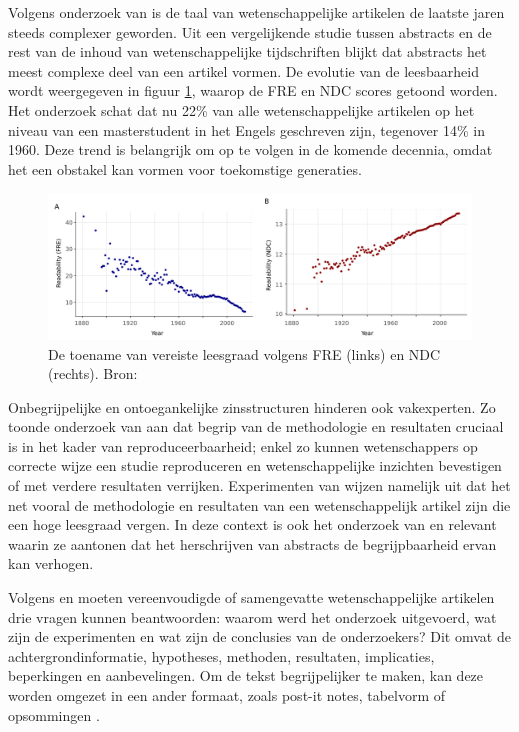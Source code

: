 Volgens onderzoek van \textcite{PlavenSigray2017} is de taal van wetenschappelijke artikelen de laatste jaren steeds complexer geworden. Uit een vergelijkende studie tussen abstracts en de rest van de inhoud van wetenschappelijke tijdschriften blijkt dat abstracts het meest complexe deel van een artikel vormen. De evolutie van de leesbaarheid wordt weergegeven in figuur \ref{img:fre-ndc}, waarop de FRE en NDC scores getoond worden. Het onderzoek schat dat nu 22\% van alle wetenschappelijke artikelen op het niveau van een masterstudent in het Engels geschreven zijn, tegenover 14\% in 1960. Deze trend is belangrijk om op te volgen in de komende decennia, omdat het een obstakel kan vormen voor toekomstige generaties.

\begin{figure}[H]
	\includegraphics[width=\linewidth]{img/fre-ndc.png}
	\caption{De toename van vereiste leesgraad volgens FRE (links) en NDC (rechts). Bron: \autocite{PlavenSigray2017}}
	\label{img:fre-ndc}
\end{figure}

Onbegrijpelijke en ontoegankelijke zinsstructuren hinderen ook vakexperten. Zo toonde onderzoek van \textcite{McNutt2014} aan dat begrip van de methodologie en resultaten cruciaal is in het kader van reproduceerbaarheid; enkel zo kunnen wetenschappers op correcte wijze een studie reproduceren en wetenschappelijke inzichten bevestigen of met verdere resultaten verrijken. Experimenten van \textcite{Hubbard2017} wijzen namelijk uit dat het net vooral de methodologie en resultaten van een wetenschappelijk artikel zijn die een hoge leesgraad vergen. In deze context is ook het onderzoek van \textcite{Hartley1999} en \textcite{Snow2010} relevant waarin ze aantonen dat het herschrijven van abstracts de begrijpbaarheid ervan kan verhogen.

\medspace

Volgens \textcite{Hollenkamp2020} en \textcite{McCombes2022} moeten vereenvoudigde of samengevatte wetenschappelijke artikelen drie vragen kunnen beantwoorden: waarom werd het onderzoek uitgevoerd, wat zijn de experimenten en wat zijn de conclusies van de onderzoekers? Dit omvat de achtergrondinformatie, hypotheses, methoden, resultaten, implicaties, beperkingen en aanbevelingen. Om de tekst begrijpelijker te maken, kan deze worden omgezet in een ander formaat, zoals post-it notes, tabelvorm of opsommingen \autocite{Rijkhoff2022}. 

